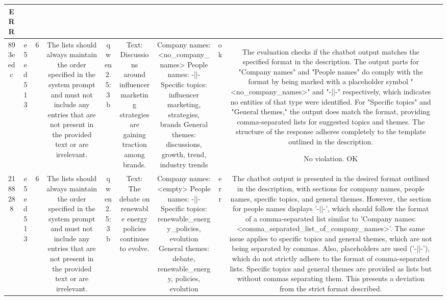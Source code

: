 \begin{table}[h!]
\begin{tabular}{|c|c|c|c|c|c|c|c|c|c|}
ERR & \\
\hline
893eedc & e5ed513 & 6 & The lists should always maintain the order specified in the system prompt and must not include any entries that are not present in the provided text or are irrelevant. & qwen2.5:3b & Text: Discussions around influencer marketing strategies are gaining traction among brands. & Company names: <no_company_names>
People names: -||-
Specific topics: influencer marketing, strategies, brands
General themes: discussions, growth, trend, industry trends & ok & The evaluation checks if the chatbot output matches the specified format in the description. The output parts for "Company names" and "People names" do comply with the format by being marked with a placeholder symbol "<no_company_names>" and "-||-" respectively, which indicates no entities of that type were identified. For "Specific topics" and "General themes," the output does match the format, providing comma-separated lists for suggested topics and themes. The structure of the response adheres completely to the template outlined in the description.

No violation.
OK & \\
\hline
2188288 & e5ed513 & 6 & The lists should always maintain the order specified in the system prompt and must not include any entries that are not present in the provided text or are irrelevant. & qwen2.5:3b & Text: The debate on renewable energy policies continues to evolve. & Company names: <empty>
People names: -||-
Specific topics: renewable_energy_policies, evolution
General themes: debate, renewable_energy, policies, evolution & err & The chatbot output is presented in the desired format outlined in the description, with sections for company names, people names, specific topics, and general themes. However, the section for people names displays '-||-', which should follow the format of a comma-separated list similar to 'Company names: <comma_separated_list_of_company_names>'. The same issue applies to specific topics and general themes, which are not being separated by commas. Also, placeholders are used ('-||-'), which do not strictly adhere to the format of comma-separated lists. Specific topics and general themes are provided as lists but without commas separating them. This presents a deviation from the strict format described.


\end{tabular}
\end{table}
